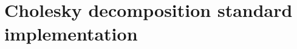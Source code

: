 \chapter{Cholesky decomposition standard implementation}\label{ch:app:cholesky}

%                 

